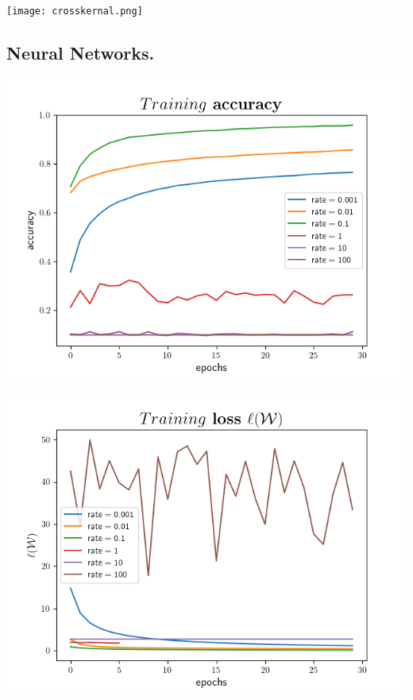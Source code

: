 \documentclass[12pt]{article}
\theoremstyle{plain}
\begin{document}
\texttt{[image: crosskernal.png]}
\label{fig:4}
 \vspace{0.4cm}
 
\subsection*{Neural Networks. }
\noindent \begin{minipage}{0.5\textwidth}
\vspace{0.4cm}
\includegraphics[width=\textwidth]{plot 4.4.png}
\label{fig:nature}
\end{minipage}
\hspace{0.02\textwidth}
\begin{minipage}{0.5\textwidth}
\vspace{0.4cm}
\includegraphics[width=\textwidth]{plot 4.5.png}
\label{fig:nature}
\end{minipage}
\end{document}
